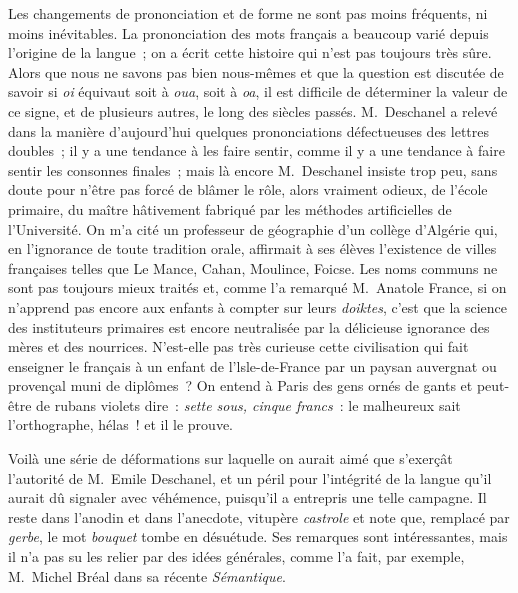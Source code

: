 \documentclass[french,twoside]{book} %
\begin{document}
Les changements de prononciation et de forme ne sont pas moins fréquents, ni moins inévitables. La prononciation des mots français a beaucoup varié depuis l’origine de la langue ; on a écrit cette histoire qui n’est pas toujours très sûre. Alors que nous ne savons pas bien nous-mêmes et que la question est discutée de savoir si {\itshape oi} équivaut soit à {\itshape oua}, soit à {\itshape oa}, il est difficile de déterminer la valeur de ce signe, et de plusieurs autres, le long des siècles passés. M. Deschanel a relevé dans la manière d’aujourd’hui quelques prononciations défectueuses des lettres doubles ; il y a une tendance à les faire sentir, comme il y a une tendance à faire sentir les consonnes finales ; mais là encore M. Deschanel insiste trop peu, sans doute pour n’être pas forcé de blâmer le rôle, alors vraiment odieux, de l’école primaire, du maître hâtivement fabriqué par les méthodes artificielles de l’Université. On m’a cité un professeur de géographie d’un collège d’Algérie qui, en l’ignorance de toute tradition orale, affirmait à ses élèves l’existence de villes françaises telles que Le Mance, Cahan, Moulince, Foicse. Les noms communs ne sont pas toujours mieux traités et, comme l’a remarqué M. Anatole France, si on n’apprend pas encore aux enfants à compter sur leurs {\itshape doiktes}, c’est que la science des instituteurs primaires est encore neutralisée par la délicieuse ignorance des mères et des nourrices. N’est-elle pas très curieuse cette civilisation qui fait enseigner le français à un enfant de l’lsle-de-France par un paysan auvergnat ou provençal muni de diplômes ? On entend à Paris des gens ornés de gants et peut-être de rubans violets dire : {\itshape sette sous, cinque francs} : le malheureux sait l’orthographe, hélas ! et il le prouve.\par
Voilà une série de déformations sur laquelle on aurait aimé que s’exerçât l’autorité de M. Emile Deschanel, et un péril pour l’intégrité de la langue qu’il aurait dû signaler avec véhémence, puisqu’il a entrepris une telle campagne. Il reste dans l’anodin et dans l’anecdote, vitupère {\itshape castrole} et note que, remplacé par {\itshape gerbe}, le mot {\itshape bouquet} tombe en désuétude. Ses remarques sont intéressantes, mais il n’a pas su les relier par des idées générales, comme l’a fait, par exemple, M. Michel Bréal dans sa récente {\itshape Sémantique}.\par
\end{document}

